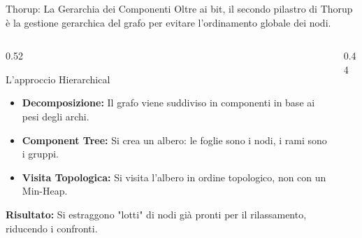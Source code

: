 \documentclass[aspectratio=169]{beamer}
\begin{document}
\begin{frame}{Thorup: La Gerarchia dei Componenti}
    Oltre ai bit, il secondo pilastro di Thorup è la gestione gerarchica del grafo per evitare l'ordinamento globale dei nodi.
    \vspace{0.3cm}

    \begin{columns}[T]
        \begin{column}{0.52\textwidth}
            \begin{block}{L'approccio Hierarchical}
                \footnotesize
                \begin{itemize}
                    \setlength{\itemsep}{0.1cm}
                    \item \textbf{Decomposizione:} Il grafo viene suddiviso in componenti in base ai pesi degli archi.
                    \item \textbf{Component Tree:} Si crea un albero: le foglie sono i nodi, i rami sono i gruppi.
                    \item \textbf{Visita Topologica:} Si visita l'albero in ordine topologico, non con un Min-Heap.
                \end{itemize}
            \end{block}
            \vspace{0.2cm}
            \footnotesize \textbf{Risultato:} Si estraggono "lotti" di nodi già pronti per il rilassamento, riducendo i confronti.
        \end{column}
        
         \begin{column}{0.44\textwidth}
        
            \centering
            \vspace{0.5cm}
            
\end{column}
\end{columns}
\end{frame}
\end{document}
